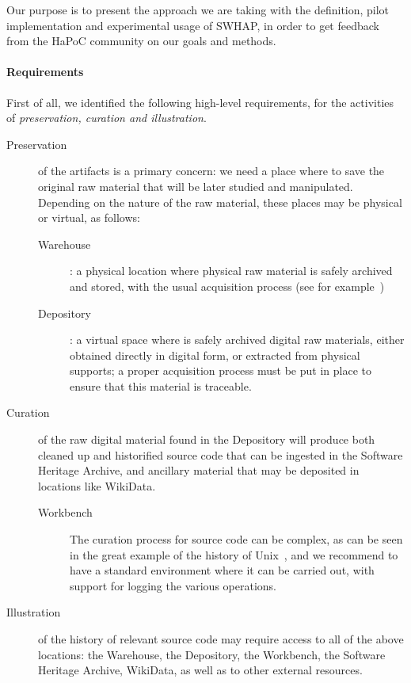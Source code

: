 \documentclass[a4paper]{article}
\begin{document}
\noindent
Our purpose is to present the approach we are taking with the definition, pilot implementation and experimental usage of SWHAP, in order to get feedback from the HaPoC community on our goals and methods. 

\paragraph{Requirements}
First of all, we identified the following high-level requirements, for the activities of \emph{preservation, curation and illustration}.



\begin{description}
	\item[Preservation] of the artifacts is a primary concern: we need a place where to save the original raw material that will be later studied and manipulated. Depending on the nature of the raw material, these places may be physical or virtual, as follows:
	\begin{description}
		\item[Warehouse]: a physical location where physical raw material is safely archived and stored, with the usual acquisition process (see for example~\cite{Spectrum})
		\item[Depository]: a virtual space where is safely archived digital raw materials, either obtained directly in digital form, or extracted from physical supports; a proper acquisition process must be put in place to ensure that this material is traceable.
        \end{description}
      \item[Curation] of the raw digital material found in the Depository will produce both cleaned up and historified source code that can be ingested in the Software Heritage Archive, and ancillary material that may be deposited in locations like WikiData.
        \begin{description}
          \item[Workbench] The curation process for source code can be complex, as can be seen in the great example of the history of Unix~\cite{Spi16g}, and we recommend to have a standard environment where it can be carried out, with support for logging the various operations.
        \end{description}
      \item[Illustration] of the history of relevant source code may require access to all of the above locations: the Warehouse, the Depository, the Workbench, the Software Heritage Archive, WikiData, as well as to other external resources.
\end{description}
\end{document}
